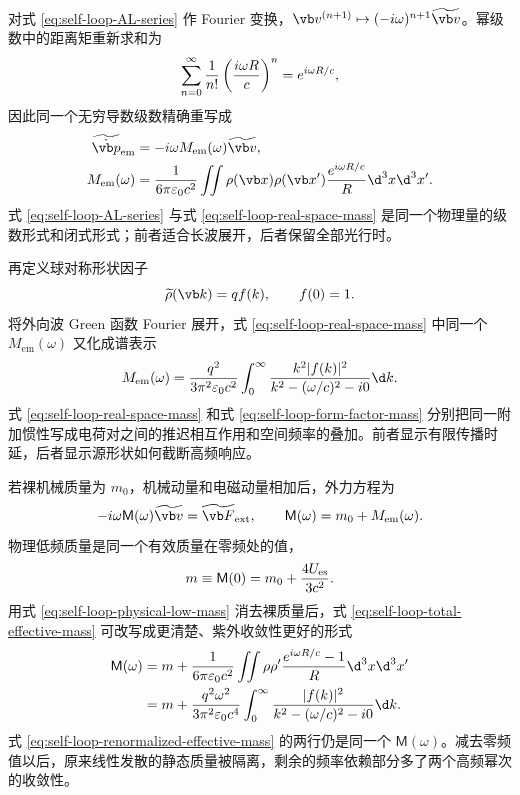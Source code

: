 对式 \eqref{eq:self-loop-AL-series} 作 Fourier 变换，$\vb v^{(n+1)}\mapsto(-i\omega)^{n+1}\widetilde{\vb v}$。幂级数中的距离矩重新求和为
\begin{equation*}
 \sum_{n=0}^\infty{1\over n!}
 \left({i\omega R\over c}\right)^n
 ={e^{i\omega R/c}},
\end{equation*}
因此同一个无穷导数级数精确重写成
\begin{align}
 \widetilde{\dot{\vb p}}_{\mathrm{em}}
 &=-i\omega M_{\mathrm{em}}(\omega)\widetilde{\vb v},
 \notag\\
 M_{\mathrm{em}}(\omega)
 &={1\over6\pi\varepsilon_0c^2}
 \iint\rho(\vb x)\rho(\vb x')
 {e^{i\omega R/c}\over R}\d^3x\d^3x'.
 \label{eq:self-loop-real-space-mass}
\end{align}
式 \eqref{eq:self-loop-AL-series} 与式 \eqref{eq:self-loop-real-space-mass} 是同一个物理量的级数形式和闭式形式；前者适合长波展开，后者保留全部光行时。

再定义球对称形状因子
\begin{equation*}
 \widetilde\rho(\vb k)=qf(k),
 \qquad f(0)=1.
\end{equation*}
将外向波 Green 函数 Fourier 展开，式 \eqref{eq:self-loop-real-space-mass} 中同一个 $M_{\mathrm{em}}(\omega)$ 又化成谱表示
\begin{equation}
 M_{\mathrm{em}}(\omega)
 ={q^2\over3\pi^2\varepsilon_0c^2}
 \int_0^\infty
 {k^2|f(k)|^2\over k^2-(\omega/c)^2-i0}\d k.
 \label{eq:self-loop-form-factor-mass}
\end{equation}
式 \eqref{eq:self-loop-real-space-mass} 和式 \eqref{eq:self-loop-form-factor-mass} 分别把同一附加惯性写成电荷对之间的推迟相互作用和空间频率的叠加。前者显示有限传播时延，后者显示源形状如何截断高频响应。

若裸机械质量为 $m_0$，机械动量和电磁动量相加后，外力方程为
\begin{equation}
 -i\omega\mathsf M(\omega)\widetilde{\vb v}
 =\widetilde{\vb F}_{\mathrm{ext}},
 \qquad
 \mathsf M(\omega)=m_0+M_{\mathrm{em}}(\omega).
 \label{eq:self-loop-total-effective-mass}
\end{equation}
物理低频质量是同一个有效质量在零频处的值，
\begin{equation}
 m\equiv\mathsf M(0)
 =m_0+{4U_{\mathrm{es}}\over3c^2}.
 \label{eq:self-loop-physical-low-mass}
\end{equation}
用式 \eqref{eq:self-loop-physical-low-mass} 消去裸质量后，式 \eqref{eq:self-loop-total-effective-mass} 可改写成更清楚、紫外收敛性更好的形式
\begin{align}
 \mathsf M(\omega)
 &=m+{1\over6\pi\varepsilon_0c^2}
 \iint\rho\rho'
 {e^{i\omega R/c}-1\over R}\d^3x\d^3x'
 \notag\\
 &=m+{q^2\omega^2\over3\pi^2\varepsilon_0c^4}
 \int_0^\infty
 {|f(k)|^2\over k^2-(\omega/c)^2-i0}\d k.
 \label{eq:self-loop-renormalized-effective-mass}
\end{align}
式 \eqref{eq:self-loop-renormalized-effective-mass} 的两行仍是同一个 $\mathsf M(\omega)$。减去零频值以后，原来线性发散的静态质量被隔离，剩余的频率依赖部分多了两个高频幂次的收敛性。

